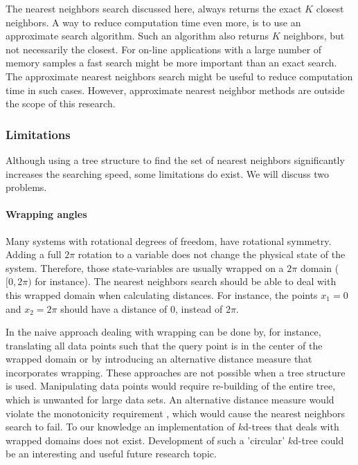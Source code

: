 The nearest neighbors search discussed here, always returns the exact $K$ closest neighbors. A way to reduce computation time even more, is to use an approximate search algorithm. Such an algorithm also returns $K$ neighbors, but not necessarily the closest.  For on-line applications with a large number of memory samples a fast search might be more important than an exact search. The approximate nearest neighbors search might be useful to reduce computation time in such cases. However, approximate nearest neighbor methods are outside the scope of this research.

\subsubsection{Limitations}
Although using a tree structure to find the set of nearest neighbors significantly increases the searching speed, some limitations do exist. We will discuss two problems.

\paragraph{Wrapping angles} Many systems with rotational degrees of freedom, have rotational symmetry. Adding a full $2\pi$ rotation to a variable does not change the physical state of the system. Therefore, those state-variables are usually wrapped on a $2\pi$ domain ($[0,2\pi)$ for instance). The nearest neighbors search should be able to deal with this wrapped domain when calculating distances. For instance, the points $x_1=0$ and $x_2=2\pi$ should have a distance of $0$, instead of $2\pi$.

In the naive approach dealing with wrapping can be done by, for instance, translating all data points such that the query point is in the center of the wrapped domain or by introducing an alternative distance measure that incorporates wrapping. These approaches are not possible when a tree structure is used. Manipulating data points would require re-building of the entire tree, which is unwanted for large data sets. An alternative distance measure would violate the monotonicity requirement , which would cause the nearest neighbors search to fail. To our knowledge an implementation of $k$d-trees that deals with wrapped domains does not exist. Development of such a 'circular' $k$d-tree could be an interesting and useful future research topic. 

